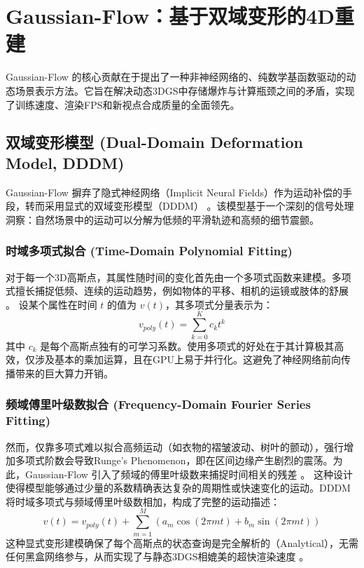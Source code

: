 \chapter{Gaussian-Flow：基于双域变形的4D重建}

Gaussian-Flow 的核心贡献在于提出了一种非神经网络的、纯数学基函数驱动的动态场景表示方法。它旨在解决动态3DGS中存储爆炸与计算瓶颈之间的矛盾，实现了训练速度、渲染FPS和新视点合成质量的全面领先。

\section{双域变形模型 (Dual-Domain Deformation Model, DDDM)}

Gaussian-Flow 摒弃了隐式神经网络（Implicit Neural Fields）作为运动补偿的手段，转而采用显式的双域变形模型（DDDM） \cite{lin2024gaussianflow_cvpr}。该模型基于一个深刻的信号处理洞察：自然场景中的运动可以分解为低频的平滑轨迹和高频的细节震颤。

\subsection{时域多项式拟合 (Time-Domain Polynomial Fitting)}

对于每一个3D高斯点，其属性随时间的变化首先由一个多项式函数来建模。多项式擅长捕捉低频、连续的运动趋势，例如物体的平移、相机的运镜或肢体的舒展 \cite{wu2025survey}。
设某个属性在时间 $t$ 的值为 $v(t)$，其多项式分量表示为：
$$
v_{poly}(t) = \sum_{k=0}^{K} c_k t^k
$$
其中 $c_k$ 是每个高斯点独有的可学习系数。使用多项式的好处在于其计算极其高效，仅涉及基本的乘加运算，且在GPU上易于并行化。这避免了神经网络前向传播带来的巨大算力开销。

\subsection{频域傅里叶级数拟合 (Frequency-Domain Fourier Series Fitting)}

然而，仅靠多项式难以拟合高频运动（如衣物的褶皱波动、树叶的颤动），强行增加多项式阶数会导致Runge's Phenomenon，即在区间边缘产生剧烈的震荡。为此，Gaussian-Flow 引入了频域的傅里叶级数来捕捉时间相关的残差 \cite{lin2024gaussianflow_cvpr}。
这种设计使得模型能够通过少量的系数精确表达复杂的周期性或快速变化的运动。DDDM 将时域多项式与频域傅里叶级数相加，构成了完整的运动描述：
$$
v(t) = v_{poly}(t) + \sum_{m=1}^{M} (a_m \cos(2\pi m t) + b_m \sin(2\pi m t))
$$
这种显式变形建模确保了每个高斯点的状态查询是完全解析的（Analytical），无需任何黑盒网络参与，从而实现了与静态3DGS相媲美的超快渲染速度 \cite{lin2024gaussianflow_cvpr}。

